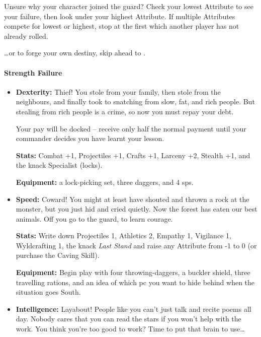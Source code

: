 \begin{multicols}{2}

\noindent
Unsure why your character joined the \gls{guard}?
Check your lowest Attribute to see your failure, then look under your highest Attribute.
If multiple Attributes compete for lowest or highest, stop at the first which another player has not already rolled.

\ldots or to forge your own destiny, skip ahead to .

\paragraph{Strength Failure}

\begin{itemize}

  \item
  \textbf{Dexterity:}
  Thief!
  You stole from your family, then stole from the neighbours, and finally took to snatching from slow, fat, and rich people.
  But stealing from rich people is a crime, so now you must repay your debt.

  Your pay will be docked -- receive only half the normal payment until your commander decides you have learnt your lesson.

  \textbf{Stats:}
  Combat +1, Projectiles +1, Crafts +1, Larceny +2, Stealth +1, and the knack Specialist (locks).

  \textbf{Equipment:}
  a lock-picking set, three daggers, and 4 \glspl{sp}.

  \item
  \textbf{Speed:}
  Coward!
  You might at least have shouted and thrown a rock at the monster, but you just hid and cried quietly.
  Now the forest has eaten our best animals.
  Off you go to the \gls{guard}, to learn courage.

  \textbf{Stats:}
  Write down Projectiles 1, Athletics 2, Empathy 1, Vigilance 1, Wyldcrafting 1, the knack \textit{Last Stand} and raise any Attribute from -1 to 0 (or purchase the Caving Skill).

  \textbf{Equipment:}
  Begin play with four throwing-daggers, a buckler shield, three travelling rations, and an idea of which \gls{pc} you want to hide behind when the situation goes South.
  \item
  \textbf{Intelligence:}
  Layabout!
  People like you can't just talk and recite poems all day.
  Nobody cares that you can read the stars if you won't help with the work.
  You think you're too good to work?
  Time to put that brain to use\ldots


\end{itemize}
\end{multicols}
